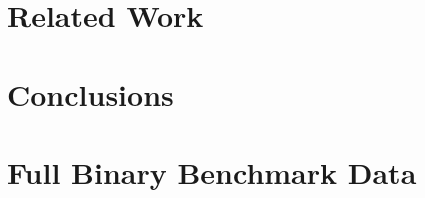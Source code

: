 \documentclass[12pt,twoside]{report}
\begin{document}
\chapter{Related Work} \label{ch:relatedwork}


\chapter{Conclusions} \label{ch:conclusion}


% 


\printbibliography

\appendix
\chapter{Full Binary Benchmark Data} \label{ch:appendices}
 
\end{document}

